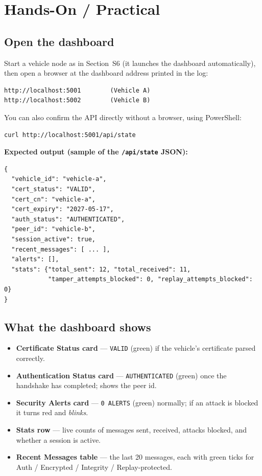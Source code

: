 \documentclass[11pt,a4paper]{article}
\begin{document}
\section{Hands-On / Practical}

\subsection{Open the dashboard}
Start a vehicle node as in Section~S6 (it launches the dashboard automatically),
then open a browser at the dashboard address printed in the log:
\begin{lstlisting}[style=term]
http://localhost:5001        (Vehicle A)
http://localhost:5002        (Vehicle B)
\end{lstlisting}

\noindent You can also confirm the API directly without a browser, using
PowerShell:
\begin{lstlisting}[style=term]
curl http://localhost:5001/api/state
\end{lstlisting}

\noindent\textbf{Expected output (sample of the \texttt{/api/state} JSON):}
\begin{lstlisting}[style=term]
{
  "vehicle_id": "vehicle-a",
  "cert_status": "VALID",
  "cert_cn": "vehicle-a",
  "cert_expiry": "2027-05-17",
  "auth_status": "AUTHENTICATED",
  "peer_id": "vehicle-b",
  "session_active": true,
  "recent_messages": [ ... ],
  "alerts": [],
  "stats": {"total_sent": 12, "total_received": 11,
            "tamper_attempts_blocked": 0, "replay_attempts_blocked": 0}
}
\end{lstlisting}

\subsection{What the dashboard shows}
\begin{itemize}
  \item \textbf{Certificate Status card} --- \texttt{VALID} (green) if the
        vehicle's certificate parsed correctly.
  \item \textbf{Authentication Status card} --- \texttt{AUTHENTICATED} (green)
        once the handshake has completed; shows the peer id.
  \item \textbf{Security Alerts card} --- \texttt{0 ALERTS} (green) normally; if
        an attack is blocked it turns red and \emph{blinks}.
  \item \textbf{Stats row} --- live counts of messages sent, received, attacks
        blocked, and whether a session is active.
  \item \textbf{Recent Messages table} --- the last 20 messages, each with
        green ticks for Auth / Encrypted / Integrity / Replay-protected.
\end{itemize}
\end{document}
